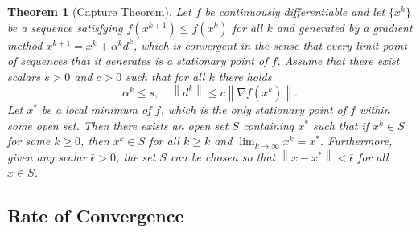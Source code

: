 \documentclass[12pt,a4paper]{article}
\numberwithin{equation}{section}
\theoremstyle{mystyle}
\newtheorem{theorem}[definition]{Theorem}
\newcommand{\grad}{\nabla}
\newcommand{\norm}[1]{\left\lVert #1 \right\rVert}
\begin{document}
	\begin{theorem}[Capture Theorem]
		Let $f$ be continuously differentiable and let $\{x^k\}$ be a sequence satisfying $f(x^{k+1})\leq f(x^k)$ for all $k$ and generated by a gradient method $x^{k+1}=x^k +\alpha^k d^k$, which is convergent in the sense that every limit point of sequences that it generates is a stationary point of $f$. Assume that there exist scalars $s>0$ and $c>0$ such that for all $k$ there holds
		$$
		\alpha^k \leq s,\quad \norm{d^k}\leq c\norm{\grad f(x^k)}.
		$$
		Let $x^*$ be a local minimum of $f$, which is the only stationary point of $f$ within some open set. Then there exists an open set $S$ containing $x^*$ such that if $x^{\bar{k}}\in S$ for some $\bar{k}\geq 0$, then $x^k\in S$ for all $k\geq \bar{k}$ and $\lim_{k\to\infty}x^k=x^*$. Furthermore, given any scalar $\bar{\epsilon}>0$, the set $S$ can be chosen so that $\norm{x-x^*}<\bar{\epsilon}$ for all $x\in S$.
	\end{theorem}
	
	\subsection{Rate of Convergence}




	\appendix
	
	 
\end{document}
